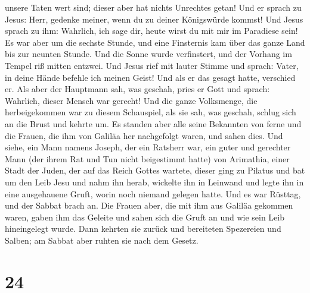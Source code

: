 unsere Taten wert sind; dieser aber hat nichts Unrechtes getan!
 Und er sprach zu Jesus: Herr, gedenke meiner, wenn du zu
deiner Königswürde kommst!  Und Jesus sprach zu ihm:
Wahrlich, ich sage dir, heute wirst du mit mir im Paradiese sein!
 Es war aber um die sechste Stunde, und eine Finsternis
kam über das ganze Land bis zur neunten Stunde.  Und die
Sonne wurde verfinstert, und der Vorhang im Tempel riß mitten entzwei.
 Und Jesus rief mit lauter Stimme und sprach: Vater, in
deine Hände befehle ich meinen Geist! Und als er das gesagt hatte,
verschied er.  Als aber der Hauptmann sah, was geschah,
pries er Gott und sprach: Wahrlich, dieser Mensch war gerecht!
 Und die ganze Volksmenge, die herbeigekommen war zu
diesem Schauspiel, als sie sah, was geschah, schlug sich an die Brust
und kehrte um.  Es standen aber alle seine Bekannten von
ferne und die Frauen, die ihm von Galiläa her nachgefolgt waren, und
sahen dies.  Und siehe, ein Mann namens Joseph, der ein
Ratsherr war, ein guter und gerechter Mann  (der ihrem
Rat und Tun nicht beigestimmt hatte) von Arimathia, einer Stadt der
Juden, der auf das Reich Gottes wartete,  dieser ging zu
Pilatus und bat um den Leib Jesu  und nahm ihn herab,
wickelte ihn in Leinwand und legte ihn in eine ausgehauene Gruft, worin
noch niemand gelegen hatte.  Und es war Rüsttag, und der
Sabbat brach an.  Die Frauen aber, die mit ihm aus
Galiläa gekommen waren, gaben ihm das Geleite und sahen sich die Gruft
an und wie sein Leib hineingelegt wurde.  Dann kehrten
sie zurück und bereiteten Spezereien und Salben; am Sabbat aber ruhten
sie nach dem Gesetz.

\hypertarget{section-23}{%
\section{24}\label{section-23}}

